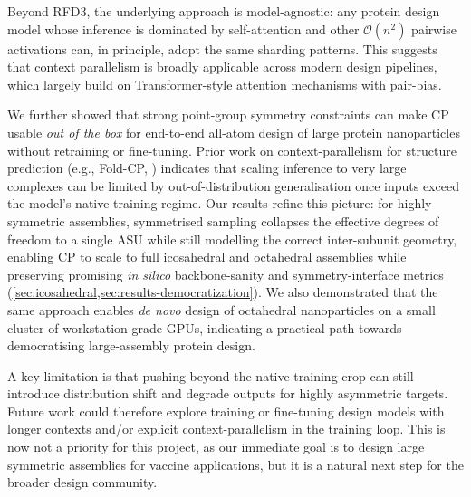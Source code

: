 Beyond RFD3, the underlying approach is model-agnostic: any protein design model whose 
inference is dominated by self-attention and other $\mathcal{O}(n^2)$ pairwise activations 
can, in principle, adopt the same sharding patterns. This suggests that context parallelism
is broadly applicable across modern design pipelines, which largely build on 
Transformer-style attention mechanisms with pair-bias.

We further showed that strong point-group symmetry constraints can make CP usable 
\emph{out of the box} for end-to-end all-atom design of large protein nanoparticles 
without retraining or fine-tuning. Prior work on context-parallelism for structure 
prediction (e.g., Fold-CP, \cite{lin_fold-cp_2026}) indicates that scaling inference to 
very large complexes can be limited by out-of-distribution generalisation once inputs exceed 
the model's native training regime. Our results refine this picture: for highly symmetric 
assemblies, symmetrised sampling collapses the effective degrees of freedom to a single ASU 
while still modelling the correct inter-subunit geometry, enabling CP to scale to full 
icosahedral and octahedral assemblies while preserving promising \emph{in silico} backbone-sanity 
and symmetry-interface metrics (\cref{sec:icosahedral,sec:results-democratization}). We 
also demonstrated that the same approach enables \emph{de novo}
design of octahedral nanoparticles on a small cluster of workstation-grade GPUs, indicating 
a practical path towards democratising large-assembly protein design.

A key limitation is that pushing beyond the native training crop can still introduce 
distribution shift and degrade outputs for highly asymmetric targets. Future work could 
therefore explore training or fine-tuning design models with longer contexts and/or explicit 
context-parallelism in the training loop. This is now not a priority for this project, as our
immediate goal is to design large symmetric assemblies for vaccine applications, but it is a 
natural next step for the broader design community.

